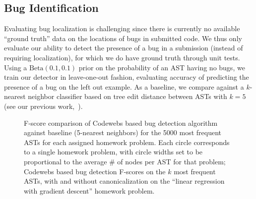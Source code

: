 \subsection{Bug Identification}
Evaluating bug localization is challenging since there is currently no available ``ground truth'' data
on the locations of bugs in submitted code.  We thus only evaluate our ability to detect
the presence of a bug in a submission (instead of requiring localization), for which we do have ground truth through unit tests.
Using a $\mbox{Beta}(0.1, 0.1)$ prior on the probability of an AST having no bugs, 
we train our detector in leave-one-out fashion, evaluating accuracy of predicting the presence of a bug 
on the left out example.  
As a baseline, we compare against a $k$-nearest neighbor classifier based on tree edit distance between
ASTs with $k=5$ (see our previous work,~\cite{huang13}).  



\begin{figure}[t!]
  \center
  \qquad\qquad

  \caption[Bug detection accuracy]{
    F-score comparison of Codewebs based bug detection algorithm against baseline (5-nearest neighbors) 
  for the 5000 most frequent ASTs for each assigned homework problem.  Each circle corresponds to a single homework problem, 
  with circle widths  set to be proportional to the average \# of nodes per AST for that problem; 
   Codewebs based bug detection F-scores on the $k$ most frequent ASTs, with and without canonicalization
  on the ``linear regression with gradient descent'' homework problem.
  }
  \label{fig:exp2}
\end{figure}


